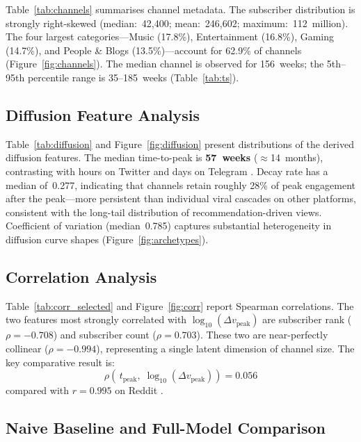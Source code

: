 \documentclass[journal,article,submit,pdftex,moreauthors]{Definitions/mdpi}
\begin{document}
Table~\ref{tab:channels} summarises channel metadata.
The subscriber distribution is strongly right-skewed (median:~42,400;
mean:~246,602; maximum:~112~million).
The four largest categories---Music (17.8\%), Entertainment (16.8\%),
Gaming (14.7\%), and People \& Blogs (13.5\%)---account for 62.9\%
of channels (Figure~\ref{fig:channels}).
The median channel is observed for 156~weeks; the 5th--95th percentile
range is 35--185~weeks (Table~\ref{tab:ts}).

\subsection{Diffusion Feature Analysis}
\label{sec:diffusion}

Table~\ref{tab:diffusion} and Figure~\ref{fig:diffusion} present
distributions of the derived diffusion features.
The median time-to-peak is \textbf{57~weeks} ($\approx$14~months),
contrasting with hours on Twitter \cite{ref-goel2016} and days on
Telegram \cite{ref-paper2}.
Decay rate has a median of~0.277, indicating that channels retain roughly
28\% of peak engagement after the peak---more persistent than individual
viral cascades on other platforms, consistent with the long-tail
distribution of recommendation-driven views.
Coefficient of variation (median~0.785) captures substantial heterogeneity
in diffusion curve shapes (Figure~\ref{fig:archetypes}).

\subsection{Correlation Analysis}
\label{sec:correlation}

Table~\ref{tab:corr_selected} and Figure~\ref{fig:corr} report Spearman
correlations.
The two features most strongly correlated with $\log_{10}(\Delta v_\text{peak})$
are subscriber rank ($\rho = -0.708$) and subscriber count ($\rho = 0.703$).
These two are near-perfectly collinear ($\rho = -0.994$), representing a
single latent dimension of channel size.
The key comparative result is:
\begin{equation}
    \rho\!\left(\,t_\text{peak},\;
    \log_{10}(\Delta v_\text{peak})\right) = 0.056
    \label{eq:ttp_corr}
\end{equation}
compared with $r = 0.995$ on Reddit \cite{ref-paper1}.

\subsection{Naive Baseline and Full-Model Comparison}
\label{sec:regression}
\end{document}
